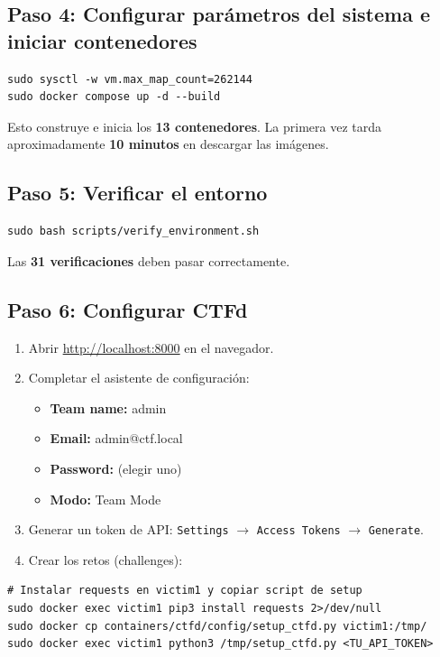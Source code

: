 \documentclass[12pt,a4paper]{article}
\begin{document}
\subsection{Paso 4: Configurar par\'ametros del sistema e iniciar contenedores}

\begin{lstlisting}
sudo sysctl -w vm.max_map_count=262144
sudo docker compose up -d --build
\end{lstlisting}

Esto construye e inicia los \textbf{13 contenedores}. La primera vez tarda aproximadamente \textbf{10 minutos} en descargar las im\'agenes.

\subsection{Paso 5: Verificar el entorno}

\begin{lstlisting}
sudo bash scripts/verify_environment.sh
\end{lstlisting}

Las \textbf{31 verificaciones} deben pasar correctamente.

\subsection{Paso 6: Configurar CTFd}

\begin{enumerate}
    \item Abrir \url{http://localhost:8000} en el navegador.
    \item Completar el asistente de configuraci\'on:
    \begin{itemize}
        \item \textbf{Team name:} admin
        \item \textbf{Email:} admin@ctf.local
        \item \textbf{Password:} (elegir uno)
        \item \textbf{Modo:} Team Mode
    \end{itemize}
    \item Generar un token de API: \texttt{Settings} $\rightarrow$ \texttt{Access Tokens} $\rightarrow$ \texttt{Generate}.
    \item Crear los retos (challenges):
\end{enumerate}

\begin{lstlisting}
# Instalar requests en victim1 y copiar script de setup
sudo docker exec victim1 pip3 install requests 2>/dev/null
sudo docker cp containers/ctfd/config/setup_ctfd.py victim1:/tmp/
sudo docker exec victim1 python3 /tmp/setup_ctfd.py <TU_API_TOKEN>
\end{lstlisting}
\end{document}
